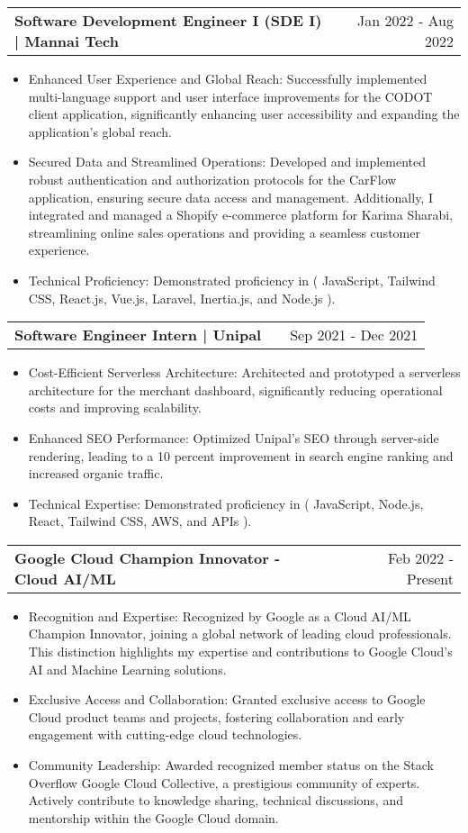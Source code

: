 \documentclass[a4paper,11pt]{article}
\makeatletter
\newenvironment{joblong}[2]
    {
    \begin{tabularx}{\linewidth}{@{}l X r@{}}
    \textbf{#1} & \hfill &  #2 \\[3.75pt]
    \end{tabularx}
    \begin{minipage}[t]{\linewidth}
    \begin{itemize}[nosep,after=\strut, leftmargin=1em, itemsep=3pt,label=--]
    }
    {
    \end{itemize}
    \end{minipage}    
    }
\makeatother
\begin{document}
\begin{joblong}{Software Development Engineer I (SDE I) | Mannai Tech}{Jan 2022 - Aug 2022}
    \item Enhanced User Experience and Global Reach: Successfully implemented multi-language support and user interface improvements for the CODOT client application, significantly enhancing user accessibility and expanding the application's global reach.
    \item Secured Data and Streamlined Operations: Developed and implemented robust authentication and authorization protocols for the CarFlow application, ensuring secure data access and management. Additionally, I integrated and managed a Shopify e-commerce platform for Karima Sharabi, streamlining online sales operations and providing a seamless customer experience.
    \item Technical Proficiency: Demonstrated proficiency in ( JavaScript, Tailwind CSS, React.js, Vue.js, Laravel, Inertia.js, and Node.js ).
    
\end{joblong}

\begin{joblong}{Software Engineer Intern | Unipal}{Sep 2021 - Dec 2021}
    \item Cost-Efficient Serverless Architecture: Architected and prototyped a serverless architecture for the merchant dashboard, significantly reducing operational costs and improving scalability.
    \item Enhanced SEO Performance: Optimized Unipal's SEO through server-side rendering, leading to a 10 percent improvement in search engine ranking and increased organic traffic.
    \item Technical Expertise: Demonstrated proficiency in ( JavaScript, Node.js, React, Tailwind CSS, AWS, and APIs ).

\end{joblong}

\begin{joblong}{Google Cloud Champion Innovator - Cloud AI/ML}{Feb 2022 - Present}
\item Recognition and Expertise: Recognized by Google as a Cloud AI/ML Champion Innovator, joining a global network of leading cloud professionals. This distinction highlights my expertise and contributions to Google Cloud's AI and Machine Learning solutions.
\item Exclusive Access and Collaboration: Granted exclusive access to Google Cloud product teams and projects, fostering collaboration and early engagement with cutting-edge cloud technologies.
\item Community Leadership: Awarded recognized member status on the Stack Overflow Google Cloud Collective, a prestigious community of experts. Actively contribute to knowledge sharing, technical discussions, and mentorship within the Google Cloud domain.

\end{joblong}
\end{document}
